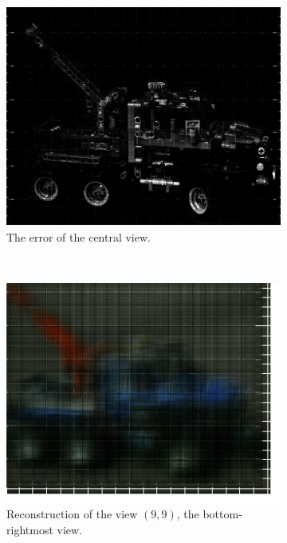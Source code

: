 \documentclass[11pt,a4paper,titlepage]{article}
\begin{document}
\begin{figure}[h]
\begin{subfigure}[t]{0.4\textwidth}
		\includegraphics[width=\textwidth]{results/legotruck_perspective_rec_3Layers_r=0/central_view_error.png}
		\caption{The error of the central view.}
	\end{subfigure}%
	\\
	\begin{subfigure}[t]{0.4\textwidth}
		\includegraphics[width=\textwidth]{results/legotruck_perspective_rec_3Layers_r=0/custom_view_reconstruction9-9.png}
		\caption{Reconstruction of the view $\left( 9, 9 \right)$, the bottom-rightmost view.}
	\end{subfigure}%
	~
	\begin{subfigure}[t]{0.4\textwidth}

\end{subfigure}
\end{figure}
\end{document}

